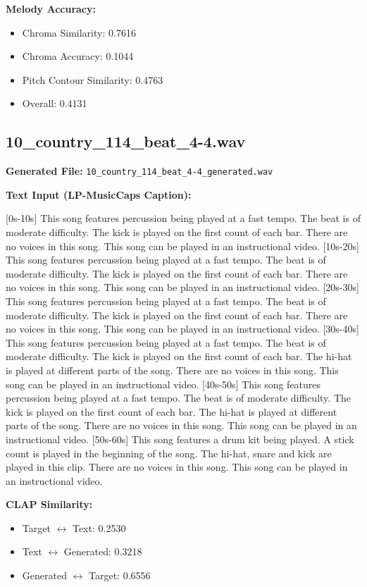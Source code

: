 \documentclass{article}
\begin{document}
\textbf{Melody Accuracy:}
\begin{itemize}
    \item Chroma Similarity: 0.7616
    \item Chroma Accuracy: 0.1044
    \item Pitch Contour Similarity: 0.4763
    \item Overall: 0.4131
\end{itemize}

\subsection{10\_country\_114\_beat\_4-4.wav}

\textbf{Generated File:} \texttt{10\_country\_114\_beat\_4-4\_generated.wav}

\textbf{Text Input (LP-MusicCaps Caption):}

\small
[0s-10s] This song features percussion being played at a fast tempo. The beat is of moderate difficulty. The kick is played on the first count of each bar. There are no voices in this song. This song can be played in an instructional video. [10s-20s] This song features percussion being played at a fast tempo. The beat is of moderate difficulty. The kick is played on the first count of each bar. There are no voices in this song. This song can be played in an instructional video. [20s-30s] This song features percussion being played at a fast tempo. The beat is of moderate difficulty. The kick is played on the first count of each bar. There are no voices in this song. This song can be played in an instructional video. [30s-40s] This song features percussion being played at a fast tempo. The beat is of moderate difficulty. The kick is played on the first count of each bar. The hi-hat is played at different parts of the song. There are no voices in this song. This song can be played in an instructional video. [40s-50s] This song features percussion being played at a fast tempo. The beat is of moderate difficulty. The kick is played on the first count of each bar. The hi-hat is played at different parts of the song. There are no voices in this song. This song can be played in an instructional video. [50s-60s] This song features a drum kit being played. A stick count is played in the beginning of the song. The hi-hat, snare and kick are played in this clip. There are no voices in this song. This song can be played in an instructional video.
\normalsize

\textbf{CLAP Similarity:}
\begin{itemize}
    \item Target $\leftrightarrow$ Text: 0.2530
    \item Text $\leftrightarrow$ Generated: 0.3218
    \item Generated $\leftrightarrow$ Target: 0.6556
\end{itemize}
\end{document}
